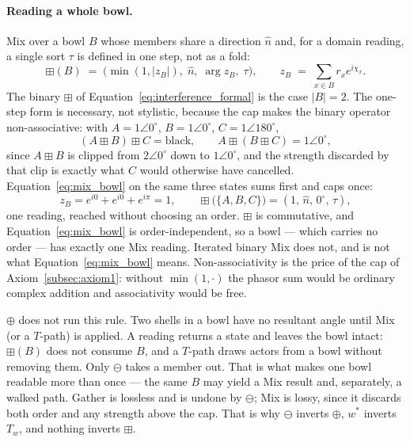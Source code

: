 \documentclass[12pt, a4paper]{article}
\begin{document}
\paragraph{Reading a whole bowl.}
Mix over a bowl $B$ whose members share a direction $\hat n$ and, for
a domain reading, a single sort $\tau$ is
defined in one step, not as a fold:
\begin{equation}
    \boxplus(B)
    \;=\;
    \bigl(\min(1,|z_B|),\;\hat n,\;\arg z_B,\;\tau\bigr),
    \qquad
    z_B \;=\; \sum_{x\in B} r_x e^{i\chi_x}.
    \label{eq:mix_bowl}
\end{equation}
The binary $\boxplus$ of Equation~\eqref{eq:interference_formal} is
the case $|B|=2$. The one-step form is necessary, not stylistic,
because the cap makes the binary operator non-associative: with
$A=1\angle 0^\circ$, $B=1\angle 0^\circ$, $C=1\angle 180^\circ$,
\[
(A\boxplus B)\boxplus C=\text{black},
\qquad
A\boxplus(B\boxplus C)=1\angle 0^\circ ,
\]
since $A\boxplus B$ is clipped from $2\angle 0^\circ$ down to
$1\angle 0^\circ$, and the strength discarded by that clip is exactly
what $C$ would otherwise have cancelled.
Equation~\eqref{eq:mix_bowl} on the same three states sums first and
caps once:
\[
z_B = e^{i0}+e^{i0}+e^{i\pi} = 1,
\qquad
\boxplus\bigl(\{A,B,C\}\bigr) = (1,\,\hat n,\,0^\circ,\,\tau),
\]
one reading, reached without choosing an order. $\boxplus$ is
commutative,
and Equation~\eqref{eq:mix_bowl} is order-independent, so a bowl ---
which carries no order --- has exactly one Mix reading. Iterated
binary Mix does not, and is not what
Equation~\eqref{eq:mix_bowl} means. Non-associativity is the price of
the cap of Axiom~\ref{subsec:axiom1}: without $\min(1,\cdot)$ the
phasor sum would be ordinary complex addition and associativity would
be free.

$\oplus$ does not run this rule. Two shells in a bowl have no
resultant angle until Mix (or a $T$-path) is applied.
A reading returns a state and leaves the bowl intact: $\boxplus(B)$
does not consume $B$, and a $T$-path draws actors from a bowl without
removing them. Only $\ominus$ takes a member out. That is what makes
one bowl readable more than once --- the same $B$ may yield a Mix
result and, separately, a walked path.
Gather is lossless and is undone by $\ominus$; Mix is lossy, since it
discards both order and any strength above the cap. That is why
$\ominus$ inverts $\oplus$, $w^{*}$ inverts $T_w$, and nothing inverts
$\boxplus$.
\end{document}
